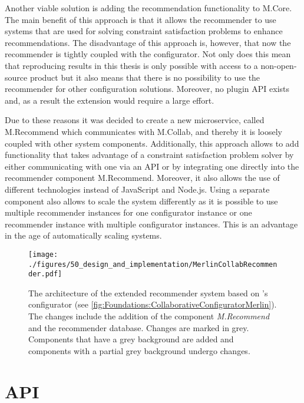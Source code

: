 Another viable solution is adding the recommendation functionality to M.Core. The main benefit of this approach is that it allows the recommender to use systems that are used for solving constraint satisfaction problems to enhance recommendations. The disadvantage of this approach is, however, that now the recommender is tightly coupled with the configurator. Not only does this mean that reproducing results in this thesis is only possible with access to a non-open-source product but it also means that there is no possibility to use the recommender for other configuration solutions. Moreover, no plugin API exists and, as a result the extension would require a large effort.

Due to these reasons it was decided to create a new microservice, called M.Recommend which communicates with M.Collab, and thereby it is loosely coupled with other system components. Additionally, this approach allows to add functionality that takes  advantage of a constraint satisfaction problem solver by either communicating with one via an API or by integrating one directly into the recommender component M.Recommend. Moreover, it also allows the use of different technologies instead of JavaScript and Node.js. Using a separate component also allows to scale the system differently as it is possible to use multiple recommender instances for one configurator instance or one recommender instance with multiple configurator instances. This is an advantage in the age of automatically scaling systems.

\begin{figure}
    \centering
    \texttt{[image: ./figures/50\_design\_and\_implementation/MerlinCollabRecommender.pdf]}
    \caption[Architecture: Recommender System and Configurator]{The architecture of the extended recommender system based on \citeauthor{raabKollaborativeProduktkonfigurationEchtzeit2019}'s configurator (see \autoref{fig:Foundations:CollaborativeConfiguratorMerlin}). The changes include the addition of the component \emph{M.Recommend} and the recommender database. Changes are marked in grey. Components that have a grey background are added and components with a partial grey background undergo changes.}
    \label{fig:DesignImplementation:RecommenderForCollaborativeConfiguratorMerlin}
\end{figure}

\section{API}
\label{sec:DesignImplementation:API}


